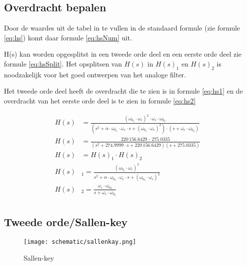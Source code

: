 \subsection{Overdracht bepalen}
\begin{minipage}{0.40\textwidth}
	Door de waardes uit de tabel in te vullen in de standaard formule (zie formule \ref{eq:hs})
	komt daar formule \ref{eq:hsNum} uit.

	\noindent
	H(s) kan worden opgesplitst in een tweede orde deel en een eerste orde deel zie formule \ref{eq:hsSplit}.
	Het opsplitsen van $H(s)$ in $H(s)_1$ en $H(s)_2$ is noodzakelijk voor het goed ontwerpen van het analoge 
	filter.

	\noindent
	Het tweede orde deel heeft de overdracht die te zien is in formule \ref{eq:hs1} en de overdracht van
	het eerste orde	deel is te zien in formule \ref{eq:hs2}
\end{minipage}
\hfill
\begin{minipage}{0.60\textwidth}
	\begin{align}
		H(s)&=\frac{(\omega_{0_1}\cdot\omega_c)^2\cdot\omega_c\cdot\omega_{0_2}}{(s^2+ \alpha \cdot \omega_{0_1} \cdot \omega_c \cdot s + (\omega_{0_1}\cdot\omega_c)^2)\cdot (s + \omega_c \cdot \omega_{0_2})} \label{eq:hs} \\
		H(s)&=\frac{220\, 156.6429\,\cdot\, 275.0335}{(s^2+274.9999\cdot s+220\, 156.6429)(s+275.0335)} \label{eq:hsNum}\\
		H(s)&= H(s)_1 \cdot H(s)_2 \label{eq:hsSplit} \\ 
		H(s)&_1=\frac{(\omega_{0_1}\cdot\omega_c)^2}{s^2+ \alpha \cdot \omega_{0_1} \cdot \omega_c \cdot s + (\omega_{0_1}\cdot\omega_c)^2} \label{eq:hs1} \\ 
		H(s)&_2=\frac{\omega_c\cdot\omega_{0_2}}{s + \omega_c \cdot \omega_{0_2}} \label{eq:hs2} \\ 
	\end{align}
\end{minipage}
 

\subsection{Tweede orde/Sallen-key}
\begin{wrapfigure}[6]{l}{0.25 \textwidth}
	\texttt{[image: schematic/sallenkay.png]}
	\caption{Sallen-key}
	\label{fig:sallenKey}
\end{wrapfigure}

